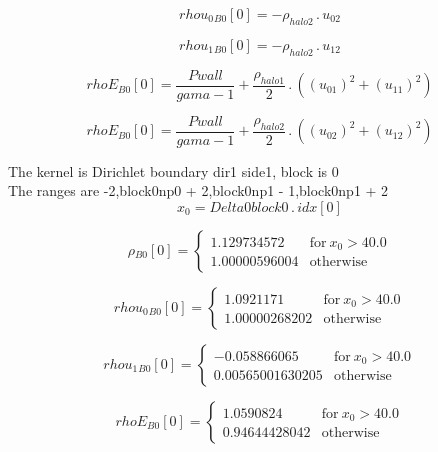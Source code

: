 \documentclass{article}
\begin{document}
\begin{dmath}{rhou_{0}{_{B0}}}[{0}] = - \rho_{halo 2} \,.\, u_{02}\end{dmath}

\begin{dmath}{rhou_{1}{_{B0}}}[{0}] = - \rho_{halo 2} \,.\, u_{12}\end{dmath}

\begin{dmath}{rhoE{_{B0}}}[{0}] = \frac{Pwall}{gama - 1} + \frac{\rho_{halo 1}}{2} \,.\, \left(\left(u_{01} \right)^{2} + \left(u_{11} \right)^{2}\right)\end{dmath}

\begin{dmath}{rhoE{_{B0}}}[{0}] = \frac{Pwall}{gama - 1} + \frac{\rho_{halo 2}}{2} \,.\, \left(\left(u_{02} \right)^{2} + \left(u_{12} \right)^{2}\right)\end{dmath}

\noindent The kernel is Dirichlet boundary dir1 side1, block is 0\\\noindent The ranges are -2,block0np0 + 2,block0np1 - 1,block0np1 + 2\\\begin{dmath}x_{0} = Delta0block0 \,.\, {idx}[{0}]\end{dmath}

\begin{dmath}{\rho{_{B0}}}[{0}] = \begin{cases} 1.129734572 & \text{for}\: x_{0} > 40.0 \\1.00000596004 & \text{otherwise} \end{cases}\end{dmath}

\begin{dmath}{rhou_{0}{_{B0}}}[{0}] = \begin{cases} 1.0921171 & \text{for}\: x_{0} > 40.0 \\1.00000268202 & \text{otherwise} \end{cases}\end{dmath}

\begin{dmath}{rhou_{1}{_{B0}}}[{0}] = \begin{cases} -0.058866065 & \text{for}\: x_{0} > 40.0 \\0.00565001630205 & \text{otherwise} \end{cases}\end{dmath}

\begin{dmath}{rhoE{_{B0}}}[{0}] = \begin{cases} 1.0590824 & \text{for}\: x_{0} > 40.0 \\0.94644428042 & \text{otherwise} \end{cases}\end{dmath}
\end{document}
